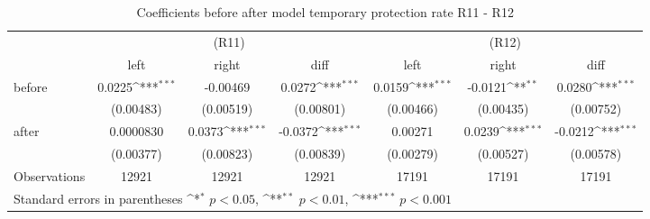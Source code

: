 \begin{table}[!ht]\centering \footnotesize
\def\sym#1{\ifmmode^{#1}\else\(^{#1}\)\fi}
\caption{Coefficients before after model temporary protection rate R11 - R12}
\begin{tabular}{l*{6}{c}}
\hline\hline
                    &\multicolumn{3}{c}{(R11)}&\multicolumn{3}{c}{(R12)}\\
&\multicolumn{1}{c}{left}&\multicolumn{1}{c}{right}&\multicolumn{1}{c}{diff}&\multicolumn{1}{c}{left}&\multicolumn{1}{c}{right}&\multicolumn{1}{c}{diff}\\
\hline
before              &      0.0225\sym{***}&    -0.00469         &      0.0272\sym{***}&      0.0159\sym{***}&     -0.0121\sym{**} &      0.0280\sym{***}\\
                    &   (0.00483)         &   (0.00519)         &   (0.00801)         &   (0.00466)         &   (0.00435)         &   (0.00752)         \\
[0,5em]
after               &   0.0000830         &      0.0373\sym{***}&     -0.0372\sym{***}&     0.00271         &      0.0239\sym{***}&     -0.0212\sym{***}\\
                    &   (0.00377)         &   (0.00823)         &   (0.00839)         &   (0.00279)         &   (0.00527)         &   (0.00578)         \\
\hline
Observations        &       12921         &       12921         &       12921         &       17191         &       17191         &       17191         \\
\hline\hline
\multicolumn{7}{l}{\footnotesize Standard errors in parentheses \sym{*} \(p<0.05\), \sym{**} \(p<0.01\), \sym{***} \(p<0.001\)}\\
\end{tabular}
\end{table}
